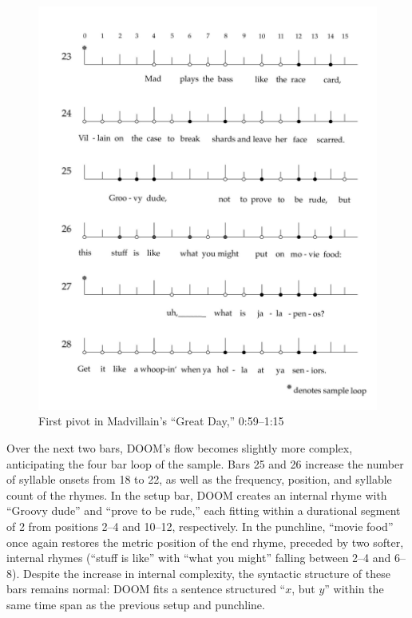     \begin{figure}[!ht]
        \centering
        \includegraphics{images/figures/chp 03/059115greatdayfirstpivot.pdf}
        \caption{First pivot in Madvillain's ``Great Day,'' 0:59--1:15}
        \label{fig:doomfirstpiv}
    \end{figure}

Over the next two bars, DOOM's flow becomes slightly more complex, anticipating the four bar loop
of the sample. Bars 25 and 26 increase the number of syllable onsets from 18 to 22, as well as the 
frequency, position, and syllable count of the rhymes. In the setup bar, DOOM creates an internal 
rhyme with ``Groovy dude'' and ``prove to  be rude,'' each fitting within a durational segment of 2
from positions 2--4 and 10--12, respectively. In the punchline, ``movie food'' once again restores
the metric position of the end rhyme, preceded by two softer, internal rhymes (``stuff is like'' with
``what you might'' falling between 2--4 and 6--8). Despite the increase in internal complexity, the 
syntactic structure of these bars remains normal: DOOM fits a sentence structured ``$x$, but $y$'' 
within the same time span as the previous setup and punchline.

